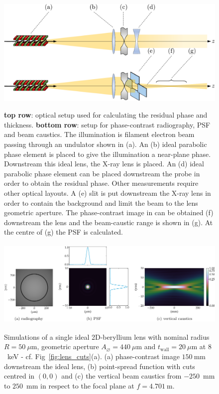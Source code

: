 \begin{refsection}
\begin{figure}[t]
    \centering
    {\includegraphics[width=.7\linewidth]{figures/ch04/simulations.pdf}}
    \caption[Optical layout used for modelling imperfections in CRL]{\textbf{top row}: optical setup used for calculating the residual phase and thickness. \textbf{bottom row}: setup for phase-contrast radiography, PSF and beam caustics.  The illumination is filament electron beam passing through an undulator shown in (a). An (b) ideal parabolic phase element is placed to give the illumination a near-plane phase. Downstream this ideal lens, the X-ray lens is placed. An (d) ideal parabolic phase element can be placed downstream the probe in order to obtain the residual phase. Other measurements require other optical layouts. A (e) slit is put downstream the X-ray lens in order to contain the background and limit the beam to the lens geometric aperture. The phase-contrast image in can be obtained (f) downstream the lens and the beam-caustic range is shown in (g). At the centre of (g) the PSF is calculated.}
    \label{fig:optical_layouts}
\end{figure}
 \begin{figure}[t]
        \centering
        {\includegraphics[height=4.19cm]{figures/ch04/CRL_ideal.pdf}}
        \caption[The ideal single X-ray lens]{Simulations of a single ideal 2D-beryllium lens with nominal radius $R=50~\mu\text{m}$, geometric aperture $A_{\diameter}=440~\mu\text{m}$ and $t_\text{wall}=20~\mu$m at $8$~keV  - cf. Fig~\ref{fig:lens_cuts}(a). (a) phase-contrast image $150~$mm downstream the ideal lens, (b) point-spread function with cuts centred in $(0,0)$ and (c) the vertical beam caustics from $-250$~mm to $250$~mm in respect to the focal plane at $f=4.701~$m.} \label{fig:ideal_CRL}
\end{figure}


\end{refsection}
